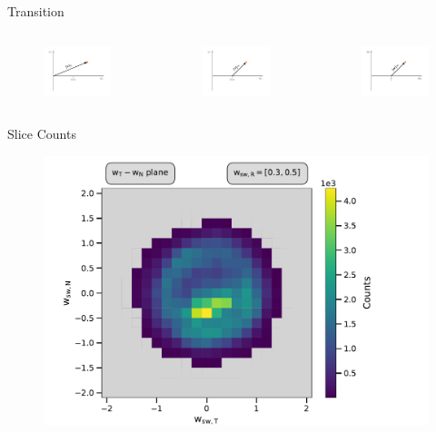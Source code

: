 \documentclass{beamer}
\begin{document}

\begin{frame}{Transition}
\begin{columns}
\column[]{5cm}
\vspace{-1cm}
	\begin{figure}
		\includegraphics[scale=2.0]{Pics/vspace_sc_trans.pdf}
	\end{figure}
	\vspace{-1cm}
	\begin{figure}
	\includegraphics[scale=2]{Pics/vspace_sw_trans.pdf}
\end{figure}


\column[]{6.2cm}
	\vspace{3.5cm}
	\begin{figure}
		\includegraphics[scale=2]{Pics/wspace_sw_trans.pdf}
	\end{figure}
\end{columns}
\end{frame}



\begin{frame}{Slice Counts}
\begin{figure}
	\includegraphics[scale=.5]{Pics/counts.pdf}
\end{figure}
\end{frame}
\end{document}
